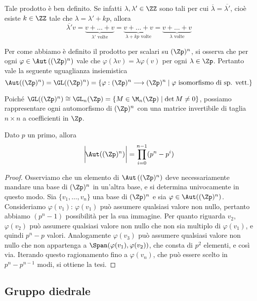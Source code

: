 \documentclass[11pt]{scrartcl}
\begin{document}
	
	Tale prodotto è ben definito. Se infatti $\lambda, \lambda' \in \ZZ$ sono tali per cui
	$\overline{\lambda} = \overline{\lambda'}$, cioè esiste $k \in \ZZ$ tale che
	$\lambda = \lambda' + kp$, allora \[
	\overline{\lambda'} v = \underset{\lambda'\text{ volte}}{\underbrace{v + \ldots + v}} = 
	\underset{\lambda + kp\text{ volte}}{\underbrace{v + \ldots + v}} = 
	\underset{\lambda\text{ volte}}{\underbrace{v + \ldots + v}}
	\]
	
	
	Per come abbiamo è definito il prodotto per scalari su $(\Zp)^n$, si osserva che per ogni
	$\varphi \in \Aut\left((\Zp)^n\right)$ vale che $\varphi(\lambda v) = \lambda\varphi(v)$ 
	per ogni $\lambda \in \Zp$. Pertanto vale la seguente uguaglianza insiemistica
	\[
	\Aut((\Zp)^n) = \GL((\Zp)^n) = \{\varphi: (\Zp)^n\longrightarrow(\Zp)^n
	\mid\varphi\text{ isomorfismo di sp. vett.}\}
	\]
	
	Poiché $\GL((\Zp)^n) \cong \GL_n(\Zp) = \{M \in \M_{n}(\Zp)\mid \det M \neq 0\}$,
	possiamo rappresentare ogni automorfismo di $(\Zp)^n$ con una matrice invertibile
	di taglia $n\times n$ a coefficienti in $\Zp$.
	
	\begin{proposition}
		\label{prop:aut_zpn}
		Dato $p$ un primo, allora \[
		\bigg| \! \Aut((\Zp)^n) \bigg| = \prod_{i = 0}^{n - 1} (p^n - p^i)
		\]
	\end{proposition}
	
	\begin{proof}
		Osserviamo che un elemento di $\Aut\left((\Zp)^n\right)$ deve necessariamente mandare 
		una base di $(\Zp)^n$ in un'altra base, e si determina univocamente in questo 
		modo. Sia $\{v_1, \ldots, v_n\}$ una base di $(\Zp)^n$ e sia $\varphi \in 
		\Aut((\Zp)^n)$. Consideriamo $\varphi(v_1)$: $\varphi(v_1)$ può assumere
		qualsiasi valore non nullo, pertanto abbiamo $(p^n - 1)$ possibilità per 
		la sua immagine. Per quanto riguarda $v_2$, $\varphi(v_2)$
		può assumere qualsiasi valore non nullo che non sia multiplo di $\varphi(v_1)$, e quindi
		$p^n - p$ valori. Analogamente $\varphi(v_3)$ può assumere qualsiasi
		valore non nullo che non appartenga a $\Span(\varphi(v_1), \varphi(v_2))$, che consta di
		$p^2$ elementi, e così via. Iterando questo ragionamento fino a $\varphi(v_n)$,
		che può essere scelto in $p^n - p^{n - 1}$ modi, si ottiene la tesi.
	\end{proof}
	
	\newpage
	
	\subsection{Gruppo diedrale}
	
\end{document}

